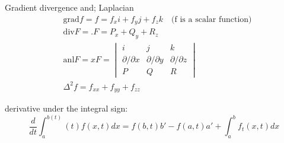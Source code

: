 \documentclass[11pt]{amsbook}
\begin{document}
Gradient divergence and; Laplacian
\begin{align*}
	&\text{grad} f = f = f_x i + f_y j + f_z k \quad \text{(f is a scalar function)} \\
	&\text{div} F = .F = P_x + Q_y + R_z \\
	&\text{anl} F = xF = \begin{vmatrix}
		i & j & k \\ \partial / \partial x & \partial / \partial y & \partial / \partial z \\
		P & Q & R
	\end{vmatrix} \\
	&\Delta^2 f = f_{xx} + f_{yy} + f_{zz}
\end{align*}

\noindent derivative under the integral sign:
\begin{equation*}
	\dfrac{d}{dt} \int^{b(t)}_a(t) f(x,t)dx = f(b,t)b' - f(a,t)a' + \int^b_a f_t(x,t) dx
\end{equation*}
\end{document}
